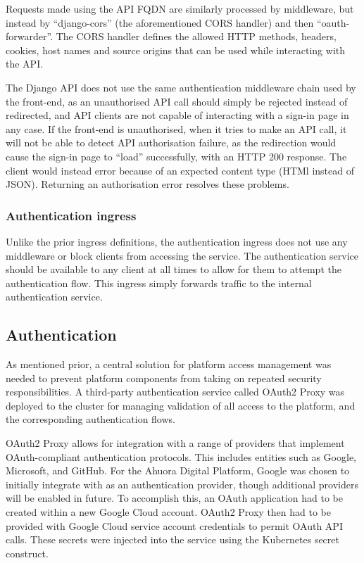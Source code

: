 Requests made using the API FQDN are similarly processed by middleware, but instead by ``django-cors'' (the aforementioned CORS handler) and then ``oauth-forwarder''. The CORS handler defines the allowed HTTP methods, headers, cookies, host names and source origins that can be used while interacting with the API.

The Django API does not use the same authentication middleware chain used by the front-end, as an unauthorised API call should simply be rejected instead of redirected, and API clients are not capable of interacting with a sign-in page in any case. If the front-end is unauthorised, when it tries to make an API call, it will not be able to detect API authorisation failure, as the redirection would cause the sign-in page to ``load'' successfully, with an HTTP 200 response. The client would instead error because of an expected content type (HTMl instead of JSON). Returning an authorisation error resolves these problems.

\subsubsection{Authentication ingress}

Unlike the prior ingress definitions, the authentication ingress does not use any middleware or block clients from accessing the service. The authentication service should be available to any client at all times to allow for them to attempt the authentication flow. This ingress simply forwards traffic to the internal authentication service.

\subsection{Authentication}

As mentioned prior, a central solution for platform access management was needed to prevent platform components from taking on repeated security responsibilities. A third-party authentication service called OAuth2 Proxy was deployed to the cluster for managing validation of all access to the platform, and the corresponding authentication flows.

OAuth2 Proxy allows for integration with a range of providers that implement OAuth-compliant authentication protocols. This includes entities such as Google, Microsoft, and GitHub. For the Ahuora Digital Platform, Google was chosen to initially integrate with as an authentication provider, though additional providers will be enabled in future. To accomplish this, an OAuth application had to be created within a new Google Cloud account. OAuth2 Proxy then had to be provided with Google Cloud service account credentials to permit OAuth API calls. These secrets were injected into the service using the Kubernetes secret construct.

